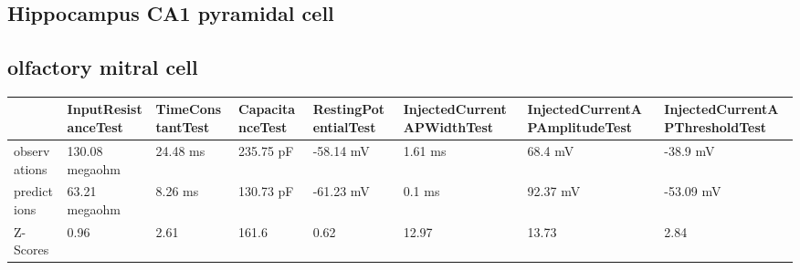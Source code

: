 \subsection{Hippocampus CA1 pyramidal cell}
\begin{table}
\end{table}

\subsection{olfactory mitral cell}
\begin{tabular}{llllllll}
\toprule
{} & InputResistanceTest & TimeConstantTest & CapacitanceTest & RestingPotentialTest & InjectedCurrentAPWidthTest & InjectedCurrentAPAmplitudeTest & InjectedCurrentAPThresholdTest \\
\midrule
observations &      130.08 megaohm &         24.48 ms &       235.75 pF &            -58.14 mV &                    1.61 ms &                        68.4 mV &                       -38.9 mV \\
predictions  &       63.21 megaohm &          8.26 ms &       130.73 pF &            -61.23 mV &                     0.1 ms &                       92.37 mV &                      -53.09 mV \\
Z-Scores     &                0.96 &             2.61 &           161.6 &                 0.62 &                      12.97 &                          13.73 &                           2.84 \\
\bottomrule
\end{tabular}
